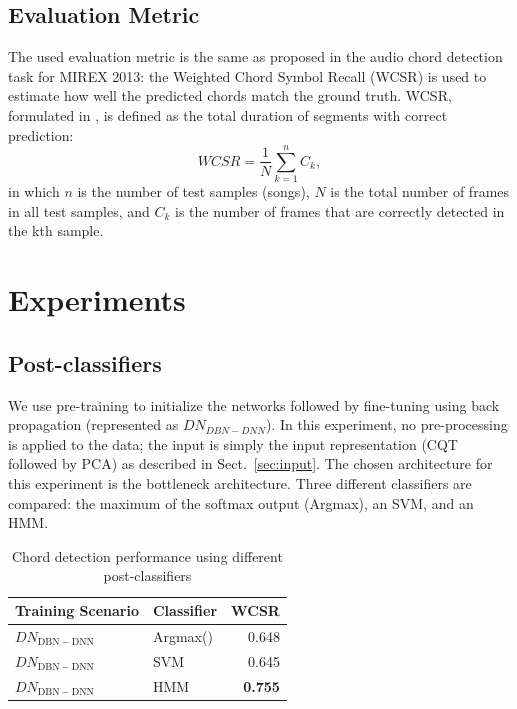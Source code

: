 \documentclass{article}
\begin{document}
\subsection{Evaluation Metric}
The used evaluation metric is the same as proposed in the audio chord detection task for MIREX 2013: the Weighted Chord Symbol Recall (WCSR) is used to estimate how well the predicted chords match the ground truth. WCSR, formulated in , is defined as the total duration of segments with correct prediction:   
\begin{equation}\label{csr}
WCSR = \frac{1}{N} \sum_{k=1}^n C_{k},
\end{equation}
in which $n$ is the number of test samples (songs), $N$ is the total number of frames in all test samples, and $C_{k}$ is the number of frames that are correctly detected in the kth sample. 

\section{Experiments}

\subsection{Post-classifiers}
We use pre-training to initialize the networks followed by fine-tuning using back propagation (represented as $DN_{DBN-DNN}$). 
In this experiment, no pre-processing is applied to the data; the input is simply the input representation (CQT followed by PCA) as described in Sect.~\ref{sec:input}. The chosen architecture for this experiment is the bottleneck architecture. 
Three different classifiers are compared: the maximum of the softmax output (Argmax), an SVM, and an HMM. 
\begin{table}
\centering
\begin{tabular*}{\columnwidth}{@{\extracolsep{\fill}}llr}
\toprule
\textbf{Training Scenario} & \textbf{Classifier} & \textbf{WCSR}  \\ \hline

$DN_\mathrm{DBN-DNN}$         & Argmax()            & 0.648 \\ 
$DN_\mathrm{DBN-DNN}$          & SVM            & 0.645 \\ 
$DN_\mathrm{DBN-DNN}$         &  HMM           & \textbf{0.755} \\ \bottomrule
\end{tabular*}
\caption{Chord detection performance using different post-classifiers}
\label{tab:dbn-dnn}
\end{table}
\end{document}
